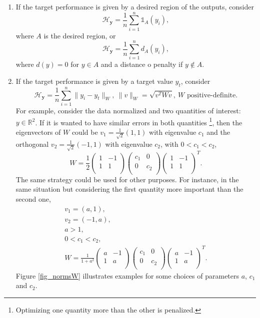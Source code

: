 \begin{enumerate}
  \item If the target performance is given by a desired region of the outputs, consider
$$\mathcal{H}_{\pmb{y}} = \frac{1}{n} \sum_{i=1}^n \mathbb{1}_{A}(y_i),$$
where $A$ is the desired region, or
$$\mathcal{H}_{\pmb{y}} = \frac{1}{n} \sum_{i=1}^n d_{A}(y_i),$$
where $d(y) = 0$ for $y \in A$ and a distance o penalty if $y\notin A$.
  \item If the target performance is given by a target value $y_t$, consider
$$\mathcal{H}_{\pmb{y}} = \frac{1}{n} \sum_{i=1}^n \|y_i-y_t\|_W, \ \|v\|_W = \sqrt{v^TWv}, \ W \text{ positive-definite}.$$
For example, consider the data normalized and two quantities of interest: $y\in\mathbb{R}^2$. If it is wanted to have similar errors in both quantities
\footnote{Optimizing one quantity more than the other is penalized.}, 
then the eigenvectors of $W$ could be $v_1=\frac{1}{\sqrt{2}}(1,1)$ with eigenvalue $c_1$ and the orthogonal $v_2=\frac{1}{\sqrt{2}}(-1,1)$ with eigenvalue $c_2$, with $0<c_1<c_2$,
$$
  W = \frac{1}{2} 
  \begin{pmatrix}
    1 & -1 \\
    1 & 1  \\
  \end{pmatrix}
  \begin{pmatrix}
    c_1 & 0 \\
    0   & c_2  \\
  \end{pmatrix}
  \begin{pmatrix}
    1 & -1 \\
    1 & 1  \\
  \end{pmatrix}^T.
$$
The same strategy could be used for other purposes. 
For instance, in the same situation but considering the first quantity more important than the second one,
$$
 \begin{array}{c}
  v_1 = (a,1), \\
  v_2 = (-1,a), \\
  a > 1, \\
  0<c_1 < c_2, \\
  W = \frac{1}{1+a^2}
  \begin{pmatrix}
    a & -1 \\
    1 & a  \\
  \end{pmatrix}
  \begin{pmatrix}
    c_1 & 0 \\
    0   & c_2  \\
  \end{pmatrix}
  \begin{pmatrix}
    a & -1 \\
    1 & a  \\
  \end{pmatrix}^T.
 \end{array} 
$$
Figure \ref{fig_normsW} illustrates examples for some choices of parameters $a$, $c_1$ and $c_2$.
\end{enumerate}

